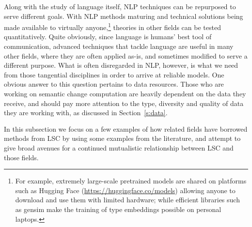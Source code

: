 \documentclass[output=paper]{langscibook}
\begin{document}
Along with the study of language itself, NLP techniques can be repurposed to serve different goals.
With NLP methods maturing and technical solutions being made available to virtually anyone,\footnote{For example, extremely large-scale pretrained models are shared on platforms such as Hugging Face (\url{https://huggingface.co/models}) allowing anyone to download and use them with limited hardware; while efficient libraries such as gensim \citep{rehurek_lrec} make the training of type embeddings possible on personal laptops.} theories in other fields can be tested quantitatively. 
Quite obviously, since language is humans' best tool of communication, advanced techniques that tackle language are useful in many other fields, where they are often applied as-is, and sometimes modified to serve a different purpose.
What is often disregarded in NLP, however, is what we need from those tangential disciplines in order to arrive at reliable models.
One obvious answer to this question pertains to data resources. Those who are working on semantic change computation are heavily dependent on the data they receive, and should pay more attention to the type, diversity and quality of data they are working with, as discussed in Section~\ref{s:data}.

In this subsection we focus on a few examples of how related fields have borrowed methods from LSC by using some examples from the literature, and attempt to give broad avenues for a continued mutualistic relationship between LSC and those fields.\largerpage[2]
\end{document}
